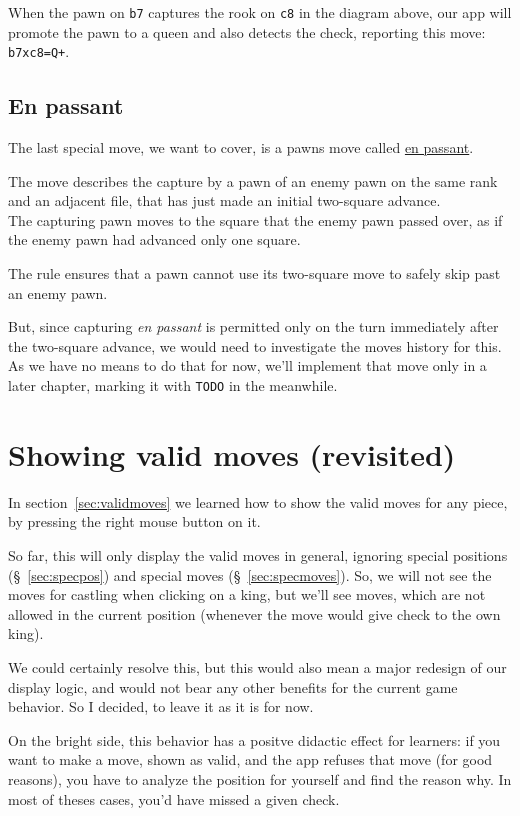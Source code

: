 When the pawn on \texttt{b7} captures the rook on \texttt{c8} in the diagram above,
our app will promote the pawn to a queen and also detects the check, reporting this move:
\texttt{b7xc8=Q+}.

\subsection{En passant}

The last special move, we want to cover, is a pawns move called
\href{https://en.wikipedia.org/wiki/En_passant}{en passant}.

The move describes the capture by a pawn of an enemy pawn on the same rank and an adjacent file,
that has just made an initial two-square advance.\\
The capturing pawn moves to the square that the enemy pawn passed over, as if the enemy pawn had
advanced only one square.

The rule ensures that a pawn cannot use its two-square move to safely skip past an enemy pawn. 

But, since capturing \emph{en passant} is permitted only on the turn immediately after the
two-square advance, we would need to investigate the moves history for this.
As we have no means to do that for now, we'll implement that move only in a later chapter,
marking it with \texttt{TODO} in the meanwhile.

\section{Showing valid moves (revisited)}

In section~\ref{sec:validmoves} we learned how to show the valid moves for any piece,
by pressing the right mouse button on it.

So far, this will only display the valid moves in general, ignoring special positions
(§~\ref{sec:specpos}) and special moves (§~\ref{sec:specmoves}).
So, we will not see the moves for castling when clicking on a king, but we'll see moves,
which are not allowed in the current position (whenever the move would give check to the own king).

We could certainly resolve this, but this would also mean a major redesign of our display logic,
and would not bear any other benefits for the current game behavior.
So I decided, to leave it as it is for now.

On the bright side, this behavior has a positve didactic effect for learners: if you want to make
a move, shown as valid, and the app refuses that move (for good reasons), you have to analyze the position
for yourself and find the reason why.
In most of theses cases, you'd have missed a given check.

